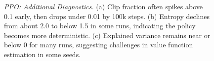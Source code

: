 \begin{figure} 
	\centering
	\caption{\emph{PPO: Additional Diagnostics.}
		(a) Clip fraction often spikes above 0.1 early, then drops under 0.01 by 100k steps.
		(b) Entropy declines from about 2.0 to below 1.5 in some runs, 
		indicating the policy becomes more deterministic.
		(c) Explained variance remains near or below 0 for many runs, 
		suggesting challenges in value function estimation in some seeds.}
	\label{fig:ppo_additional_losses}
\end{figure}

